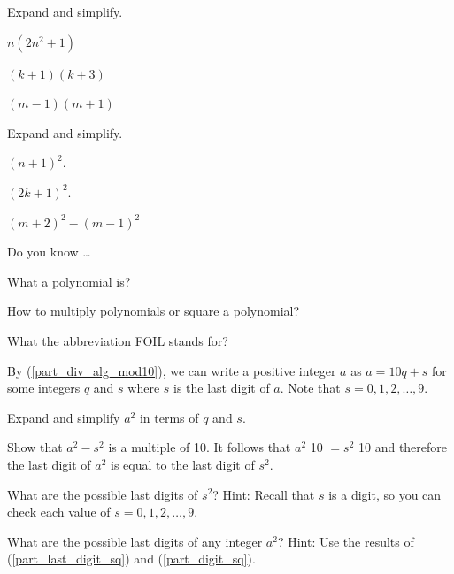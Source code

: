\begin{exer} [\exerP] %
\label{exer_expanding_polys}
    Expand and simplify.
    \begin{exerpart}
        \item $n(2n^2+1)$
        \item $(k+1)(k+3)$
        \item $(m-1)(m+1)$
    \end{exerpart}
\end{exer}

\begin{exer} [\exerU] %
\label{exer_square_polys}
    Expand and simplify.
    \begin{exerpart}
        \item $(n+1)^2$.
        \item $(2k+1)^2$.
        \item $(m+2)^2-(m-1)^2$
    \end{exerpart}
\end{exer}

\begin{exer}[\exerR] %
\label{exer_dyk_polys}
    Do you know \ldots
        \begin{exerpart}
            \item What a polynomial is?
            \item How to multiply polynomials or square a polynomial?
            \item What the abbreviation FOIL stands for?
        \end{exerpart}
\end{exer}

\begin{exer}[\exerE] %
\label{exer_last_digit_square}
    By (\ref{part_div_alg_mod10}), we can write a positive integer $a$ as $a=10q+s$ for some integers $q$ and $s$ where $s$ is the last digit of $a$. Note that $s=0,1,2,\ldots,9$.
        \begin{exerpart}
            \item Expand and simplify $a^2$ in terms of $q$ and $s$.
            \item \label{part_last_digit_sq} Show that $a^2-s^2$ is a multiple of 10. It follows that $a^2$  10 $=s^2$  10 and therefore the last digit of $a^2$ is equal to the last digit of $s^2$.
            \item \label{part_digit_sq} What are the possible last digits of $s^2$?  Hint: Recall that $s$ is a digit, so you can check each value of $s=0,1,2,\ldots,9$.
            \item What are the possible last digits of any integer $a^2$?  Hint: Use the results of (\ref{part_last_digit_sq}) and (\ref{part_digit_sq}).
        \end{exerpart}
\end{exer}

